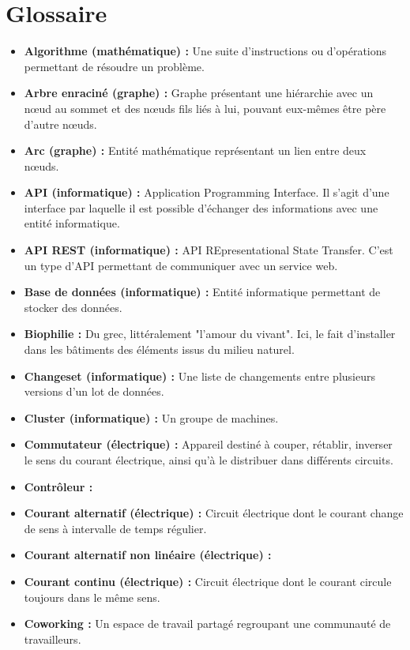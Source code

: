 \chapter*{Glossaire}

\begin{itemize}
    \item \textbf{Algorithme (mathématique) :} Une suite d'instructions ou d'opérations permettant de résoudre un problème.
    \item \textbf{Arbre enraciné (graphe) :} Graphe présentant une hiérarchie avec un nœud au sommet et des nœuds fils liés à lui, pouvant eux-mêmes être père d'autre nœuds.
    \item \textbf{Arc (graphe) :} Entité mathématique représentant un lien entre deux nœuds.
    \item \textbf{API (informatique) :} Application Programming Interface. Il s'agit d'une interface par laquelle
il est possible d'échanger des informations avec une entité informatique.
    \item \textbf{API REST (informatique) :} API REpresentational State Transfer.
C'est un type d'API permettant de communiquer avec un service web.
    \item \textbf{Base de données (informatique) :} Entité informatique permettant de stocker des données.
    \item \textbf{Biophilie :} Du grec, littéralement "l'amour du vivant".
Ici, le fait d'installer dans les bâtiments des éléments issus du milieu naturel.
    \item \textbf{Changeset (informatique) :} Une liste de changements entre plusieurs versions d'un lot de données.
    \item \textbf{Cluster (informatique) :} Un groupe de machines.
    \item \textbf{Commutateur (électrique) :} Appareil destiné à couper, rétablir, inverser le sens du courant électrique, ainsi qu'à le distribuer dans différents circuits.
    \item \textbf{Contrôleur :}
    \item \textbf{Courant alternatif (électrique) :} Circuit électrique dont le courant change de sens à intervalle de temps régulier.
    \item \textbf{Courant alternatif non linéaire (électrique) :}
    \item \textbf{Courant continu (électrique) :} Circuit électrique dont le courant circule toujours dans le même sens.
    \item \textbf{Coworking :} Un espace de travail partagé regroupant une communauté de travailleurs.

\end{itemize}
